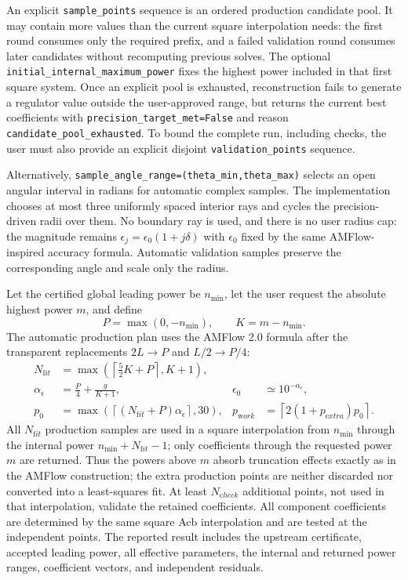 \documentclass[11pt]{article}
\newcommand{\eps}{\epsilon}
\begin{document}
An explicit \texttt{sample\_points} sequence is an ordered production candidate pool.  It may
contain more values than the current square interpolation needs: the first round consumes only
the required prefix, and a failed validation round consumes later candidates without recomputing
previous solves.  The optional \texttt{initial\_internal\_maximum\_power} fixes the highest power
included in that first square system.  Once an explicit pool is exhausted, reconstruction fails
to generate a regulator value outside the user-approved range, but returns the current best
coefficients with \texttt{precision\_target\_met=False} and reason
\texttt{candidate\_pool\_exhausted}.  To bound the complete run, including checks, the user must
also provide an explicit disjoint \texttt{validation\_points} sequence.

Alternatively, \texttt{sample\_angle\_range=(theta\_min,theta\_max)} selects an open angular
interval in radians for automatic complex samples.  The implementation chooses at most three
uniformly spaced interior rays and cycles the precision-driven radii over them.  No boundary ray
is used, and there is no user radius cap: the magnitude remains
$\epsilon_j=\epsilon_0(1+j\delta)$ with $\epsilon_0$ fixed by the same AMFlow-inspired accuracy
formula.  Automatic validation samples preserve the corresponding angle and scale only the radius.

Let the certified global leading power be $n_{\min}$, let the user request the absolute
highest power $m$, and define
\begin{equation}
  P=\max(0,-n_{\min}),\qquad K=m-n_{\min}.
\end{equation}
The automatic production plan uses the AMFlow 2.0 formula after the transparent replacements
$2L\to P$ and $L/2\to P/4$:
\begin{align}
 N_{\mathrm fit}&=
 \max\!\left(\left\lceil\frac52K+P\right\rceil,K+1\right),\\
 \alpha_\eps&=\frac P4+\frac{g}{K+1},
 &\eps_0&\simeq10^{-\alpha_\eps},\\
 p_0&=\max\left(\left\lceil(N_{\mathrm fit}+P)\alpha_\eps\right\rceil,30\right),
 &p_{\mathrm work}&=\left\lceil2(1+p_{\mathrm extra})p_0\right\rceil.
  \label{eq:ndes-series-reconstruction-default}
\end{align}
All $N_{\mathrm fit}$ production samples are used in a square interpolation from
$n_{\min}$ through the internal power
$n_{\min}+N_{\mathrm fit}-1$; only coefficients through the requested power $m$ are returned.
Thus the powers above $m$ absorb truncation effects exactly as in the AMFlow construction;
the extra production points are neither discarded nor converted into a least-squares fit.
At least $N_{\mathrm check}$ additional points, not used in that interpolation, validate the
retained coefficients.  All component coefficients are determined by the same square Acb
interpolation and are tested at the independent points.  The reported result includes the
upstream certificate, accepted leading power, all effective parameters, the internal and returned
power ranges, coefficient vectors, and independent residuals.
\end{document}
